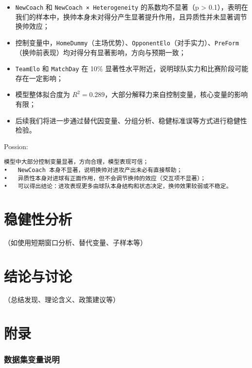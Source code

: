 \documentclass[
]{ctexart}
\providecommand{\tightlist}{%
  \setlength{\itemsep}{0pt}\setlength{\parskip}{0pt}}\usepackage{longtable,booktabs,array}
\begin{document}
\begin{itemize}
\tightlist
\item
  \texttt{NewCoach} 和 \texttt{NewCoach\ ×\ Heterogeneity}
  的系数均不显著（p \textgreater{}
  0.1），表明在我们的样本中，换帅本身未对得分产生显著提升作用，且异质性并未显著调节换帅效应；
\item
  控制变量中，\texttt{HomeDummy}（主场优势）、\texttt{OpponentElo}（对手实力）、\texttt{PreForm}（换帅前表现）均对得分有显著影响，方向与预期一致；
\item
  \texttt{TeamElo} 和 \texttt{MatchDay} 在 10\%
  显著性水平附近，说明球队实力和比赛阶段可能存在一定影响；
\item
  模型整体拟合度为
  \(R^2 = 0.289\)，大部分解释力来自控制变量，核心变量的影响有限；
\item
  后续我们将进一步通过替代因变量、分组分析、稳健标准误等方式进行稳健性检验。
\end{itemize}

Possion:

\begin{verbatim}
模型中大部分控制变量显著，方向合理，模型表现可信；
•   NewCoach 本身不显著，说明换帅对进攻产出未必有直接帮助；
•   异质性本身对进球有正面作用，但不会调节换帅的效应（交互项不显著）；
•   可以得出结论：进攻表现更多由球队本身结构和状态决定，换帅效果较弱或不稳定。
\end{verbatim}

\section{稳健性分析}\label{ux7a33ux5065ux6027ux5206ux6790}

（如使用短期窗口分析、替代变量、子样本等）

\section{结论与讨论}\label{ux7ed3ux8bbaux4e0eux8ba8ux8bba}

（总结发现、理论含义、政策建议等）

\section{附录}\label{ux9644ux5f55}

\subsubsection{数据集变量说明}\label{ux6570ux636eux96c6ux53d8ux91cfux8bf4ux660e}
\end{document}
